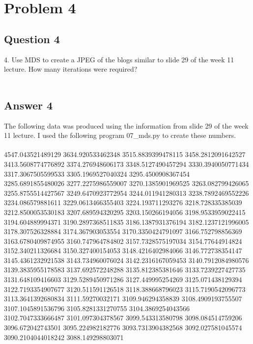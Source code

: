 \documentclass[10pt,letterpaper]{article}
\begin{document}
\pagebreak
\section{Problem 4}
\subsection{Question 4}
4.  Use MDS to create a JPEG of the blogs similar to slide 29 of the week 11 lecture.  How many iterations were required?\\
\\
\subsection{Answer 4}
The following data was produced using the information from slide 29 of the week 11 lecture.  I used the following program 07\_mds.py to create these numbers.\\
\\
4547.043521489129
3634.920533462348
3515.8839399478115
3458.2812091642527
3413.5608774776892
3374.276948606173
3348.5127490457294
3330.3940050771434
3317.3067505599533
3305.1969527040324
3295.4500908367454
3285.6891855480026
3277.2275986559007
3270.1385901969525
3263.082799426065
3255.8755514427567
3249.6470923772954
3244.011941280313
3238.7892469552226
3234.086579881611
3229.0613466355403
3224.193711293276
3218.728335385039
3212.8500053530183
3207.689594320295
3203.150266194056
3198.9533959022415
3194.604889994371
3190.2897368511835
3186.1387931376194
3182.1237121996005
3178.307526328884
3174.367903053554
3170.3350424791097
3166.752798856369
3163.6780409874955
3160.747964784802
3157.7328575197034
3154.77644914824
3152.340211326684
3150.327400154053
3148.4216402984066
3146.772738354147
3145.4361232921538
3143.734960076024
3142.2316167059453
3140.7912084980576
3139.3835955178583
3137.692572248288
3135.812385381646
3133.7239227427735
3131.648109416603
3129.5289450971286
3127.449995254269
3125.071438129394
3122.7193354907677
3120.511591126518
3118.388668796023
3115.7190542096773
3113.3641392680834
3111.59270032171
3109.946294358839
3108.4909193755507
3107.1045891536796
3105.8281331270755
3104.3869254043566
3102.7047333666487
3101.097304378567
3099.543313580798
3098.084514759206
3096.672042743501
3095.224982182776
3093.7313904382568
3092.027581045574
3090.2104044018242
3088.149298803071
\end{document}
